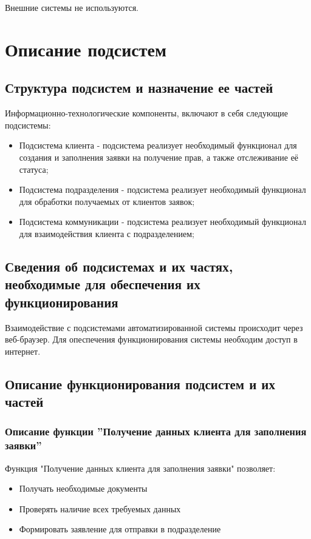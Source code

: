 \documentclass[russian, utf8, 12pt,pointsubsection,floatsubsection]{eskdtext}
\begin{document}
Внешние системы не используются.

\section{Описание подсистем}

\subsection{Структура подсистем и назначение ее частей}
Информационно-технологические компоненты, включают в себя
следующие подсистемы:
\begin{itemize}
    \item Подсистема клиента - подсистема реализует необходимый функционал для создания и заполнения заявки на получение прав, а также отслеживание её статуса;
    \item Подсистема подразделения - подсистема реализует необходимый функционал для обработки получаемых от клиентов заявок;
    \item Подсистема коммуникации - подсистема реализует необходимый функционал для взаимодействия клиента с подразделением;
\end{itemize}

\subsection{Сведения об подсистемах и их частях, необходимые для обеспечения их функционирования}

Взаимодействие с подсистемами автоматизированной системы происходит через веб-браузер. Для опеспечения функционирования системы необходим доступ в интернет.

\subsection{Описание функционирования подсистем и их частей}
\subsubsection{Описание функции ''Получение данных клиента для заполнения заявки''}
Функция "Получение данных клиента для заполнения заявки" позволяет:
\begin{itemize}
    \item Получать необходимые документы
    \item Проверять наличие всех требуемых данных
    \item Формировать заявление для отправки в подразделение
\end{itemize}
\end{document}
